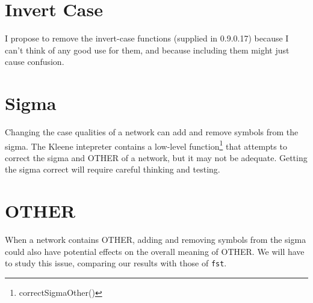 \documentclass[letterpaper,12pt]{article}
\begin{document}
\section{Invert Case}

I propose to remove the invert-case functions (supplied in 0.9.0.17) because I
can't think of any good use for them, and because including them might just
cause confusion.

\section{Sigma}

Changing the case qualities of a network can add and remove symbols from the sigma.
The Kleene intepreter contains a low-level function\footnote{correctSigmaOther()} that attempts to correct the sigma and OTHER of a
network, but it may not be adequate.  Getting the sigma correct will require careful
thinking and testing.

\section{OTHER}

When a network contains OTHER, adding and removing symbols from the sigma could also
have potential effects on the overall meaning of OTHER.  We will have to study this
issue, comparing our results with those of \texttt{fst}.
\end{document}
